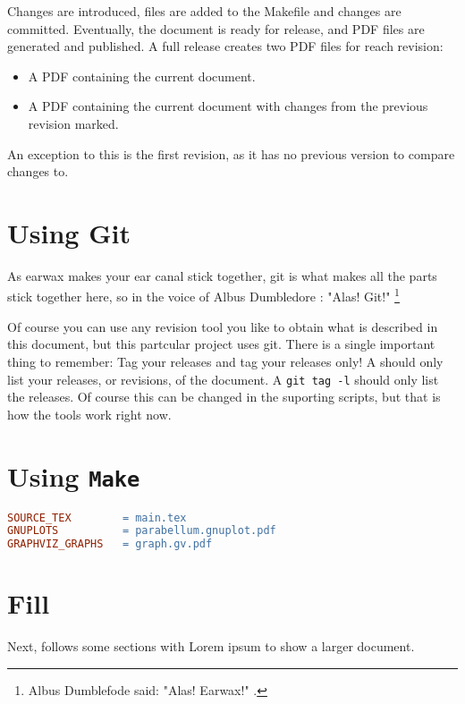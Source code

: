\documentclass[10pt, a4paper]{article} %
\newcommand{\code}[1]{\texttt{#1}}
\begin{document}
Changes are introduced, files are added to the Makefile and changes are committed. Eventually, the document is ready for release, and PDF files are generated and published. A full release creates two PDF files for reach revision:
\begin{itemize}
	\item A PDF containing the current document.
	\item A PDF containing the current document with changes from the previous revision marked.
\end{itemize}

An exception to this is the first revision, as it has no previous version to compare changes to. 


\section{Using Git}

As earwax makes your ear canal stick together, git is what makes all the parts stick together here, so in the voice of Albus Dumbledore : "Alas! Git!" \footnote{Albus Dumblefode said: "Alas! Earwax!" \citep{HarryPotter1}.}

Of course you can use any revision tool you like to obtain what is described in this document, but this partcular project uses git. There is a single important thing to remember: Tag your releases and tag your releases only! A  should only list your releases, or revisions, of the document. A \code{git tag -l} should only list the releases. Of course this can be changed in the suporting scripts, but that is how the tools work right now.

\section{Using \texttt{Make} }

\begin{lstlisting}[language=make, caption={Indlucind a PDF as a figure}, label=lst:include-pdf-as-figure]
SOURCE_TEX        = main.tex
GNUPLOTS          = parabellum.gnuplot.pdf
GRAPHVIZ_GRAPHS   = graph.gv.pdf
\end{lstlisting}

\section{Fill}

Next, follows some sections with Lorem ipsum to show a larger document.
\end{document}
